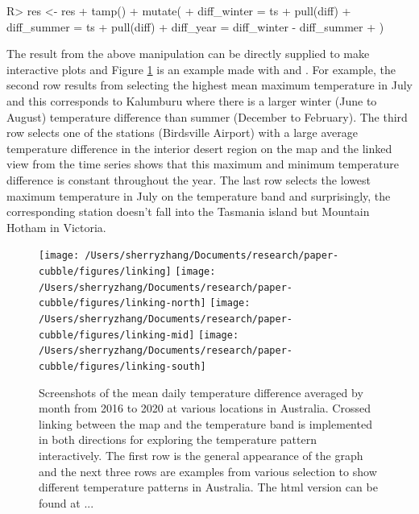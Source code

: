 \documentclass[
]{jss}
\begin{document}
\begin{CodeChunk}
\begin{CodeInput}
R> res <- res %
+   tamp() %
+   mutate(
+     diff_winter = ts %
+       pull(diff) %
+     diff_summer = ts %
+       pull(diff) %
+     diff_year = diff_winter - diff_summer
+   )
\end{CodeInput}
\end{CodeChunk}

The result from the above manipulation can be directly supplied to make
interactive plots and Figure \ref{fig:interactive-linking} is an example
made with  and . For example, the second row
results from selecting the highest mean maximum temperature in July and
this corresponds to Kalumburu where there is a larger winter (June to
August) temperature difference than summer (December to February). The
third row selects one of the stations (Birdsville Airport) with a large
average temperature difference in the interior desert region on the map
and the linked view from the time series shows that this maximum and
minimum temperature difference is constant throughout the year. The last
row selects the lowest maximum temperature in July on the temperature
band and surprisingly, the corresponding station doesn't fall into the
Tasmania island but Mountain Hotham in Victoria.

\begin{CodeChunk}
\begin{figure}

{\centering \texttt{[image: /Users/sherryzhang/Documents/research/paper-cubble/figures/linking]} \texttt{[image: /Users/sherryzhang/Documents/research/paper-cubble/figures/linking-north]} \texttt{[image: /Users/sherryzhang/Documents/research/paper-cubble/figures/linking-mid]} \texttt{[image: /Users/sherryzhang/Documents/research/paper-cubble/figures/linking-south]} 

}

\caption[Screenshots of the mean daily temperature difference averaged by month from 2016 to 2020 at various locations in Australia]{Screenshots of the mean daily temperature difference averaged by month from 2016 to 2020 at various locations in Australia. Crossed linking between the map and the temperature band is implemented in both directions for exploring the temperature pattern interactively. The first row is the general appearance of the graph and the next three rows are examples from various selection to show different temperature patterns in Australia. The html version can be found at ...}\label{fig:interactive-linking}
\end{figure}
\end{CodeChunk}
\end{document}
